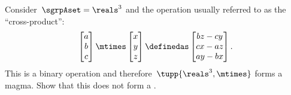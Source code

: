\begin{exercise}
    \label{ex:cross_prod}
    Consider~$\sgrpAset=\reals^3$ and the operation usually referred to as the ``cross-product'':
    \begin{equation}
        \begin{bmatrix}
            a \\ b\\ c
        \end{bmatrix}
        \mtimes
        \begin{bmatrix}
            x \\ y \\ z
        \end{bmatrix}
        \definedas
        \begin{bmatrix}
            bz-cy \\
            cx-az \\
            ay-bx
        \end{bmatrix}.
    \end{equation}
    This is a binary operation and therefore~$\tupp{\reals^3,\mtimes}$ forms a magma.
    Show that this does not form a .
\end{exercise}
%
